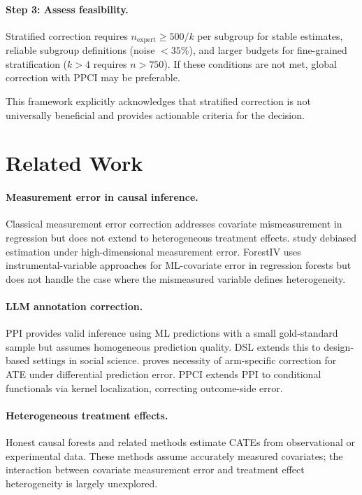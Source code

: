 \documentclass[11pt,a4paper]{article}
\begin{document}
\paragraph{Step 3: Assess feasibility.} Stratified correction requires $n_{\text{expert}} \geq 500/k$ per subgroup for stable estimates, reliable subgroup definitions (noise $< 35\%$), and larger budgets for fine-grained stratification ($k > 4$ requires $n > 750$). If these conditions are not met, global correction with PPCI may be preferable.

This framework explicitly acknowledges that stratified correction is not universally beneficial and provides actionable criteria for the decision.

\section{Related Work}

\paragraph{Measurement error in causal inference.} Classical measurement error correction \citep{carroll2006measurement} addresses covariate mismeasurement in regression but does not extend to heterogeneous treatment effects. \citet{buhlmann2020debiasing} study debiased estimation under high-dimensional measurement error. ForestIV \citep{bu2023treatment} uses instrumental-variable approaches for ML-covariate error in regression forests but does not handle the case where the mismeasured variable defines heterogeneity.

\paragraph{LLM annotation correction.} PPI \citep{angelopoulos2023prediction} provides valid inference using ML predictions with a small gold-standard sample but assumes homogeneous prediction quality. DSL \citep{egami2024using} extends this to design-based settings in social science. \citet{mozer2026arm} proves necessity of arm-specific correction for ATE under differential prediction error. PPCI \citep{sui2026ppci} extends PPI to conditional functionals via kernel localization, correcting outcome-side error.

\paragraph{Heterogeneous treatment effects.} Honest causal forests \citep{athey2019generalized} and related methods \citep{kunzel2019metalearners,nie2021quasi} estimate CATEs from observational or experimental data. These methods assume accurately measured covariates; the interaction between covariate measurement error and treatment effect heterogeneity is largely unexplored.
\end{document}
